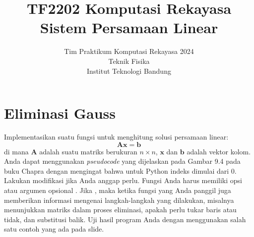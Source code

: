 



\title{%
{\small TF2202 Komputasi Rekayasa}\\
Sistem Persamaan Linear
}
\author{Tim Praktikum Komputasi Rekayasa 2024\\
Teknik Fisika\\
Institut Teknologi Bandung}
\date{}
\maketitle


\section{Eliminasi Gauss}

\begin{soal}
Implementasikan suatu fungsi untuk menghitung solusi persamaan linear:
\begin{equation*}
\mathbf{A}\mathbf{x} = \mathbf{b}
\end{equation*}
di mana $\mathbf{A}$ adalah suatu matriks berukuran $n \times n$, 
$\mathbf{x}$ dan $\mathbf{b}$ adalah vektor kolom.
Anda dapat menggunakan \textit{pseudocode} yang dijelaskan pada Gambar 9.4
pada buku Chapra dengan mengingat bahwa untuk Python indeks dimulai dari 0.
Lakukan modifikasi jika Anda anggap perlu.
Fungsi Anda harus memiliki opsi atau argumen opsional .
Jika , maka ketika fungsi yang Anda panggil juga
memberikan informasi mengenai langkah-langkah yang dilakukan, misalnya
menunjukkan matriks dalam proses eliminasi, apakah perlu tukar baris atau tidak,
dan substitusi balik. Uji hasil program Anda dengan menggunakan salah satu contoh
yang ada pada slide.
\end{soal}

